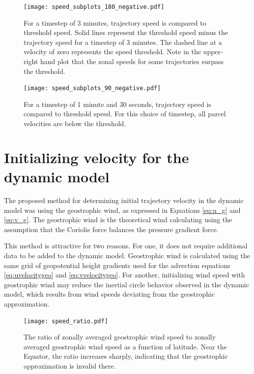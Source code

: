 \begin{figure}
    \texttt{[image: speed\_subplots\_180\_negative.pdf]}
    \centering
    \caption{For a timestep of 3 minutes, trajectory speed is compared to threshold speed.
    Solid lines represent the threshold speed minus the trajectory speed for a timestep of 3 minutes. 
    The dashed line at a velocity of zero represents the speed threshold.
    Note in the upper-right hand plot that the zonal speeds for some trajectories surpass the threshold. }
    \label{fig:speed_subplots_180_negative}
\end{figure}

\begin{figure}
    \texttt{[image: speed\_subplots\_90\_negative.pdf]}
    \centering
    \caption{For a timestep of 1 minute and 30 seconds, trajectory speed is compared to threshold speed.
    For this choice of timestep, all parcel velocities are below the threshold.}
    \label{fig:speed_subplots_90_negative}
\end{figure}

\section{Initializing velocity for the dynamic model}

The proposed method for determining initial trajectory velocity in the dynamic model was using the geostrophic wind, as expressed in Equations \ref{eq:u_g} and \ref{eq:v_g}.
The geostrophic wind is the theoretical wind calculating using the assumption that the Coriolis force balances the pressure gradient force.

This method is attractive for two reasons.
For one, it does not require additional data to be added to the dynamic model.
Geostrophic wind is calculated using the same grid of geopotential height gradients used for the advection equations \ref{eq:uvelocitygeo} and \ref{eq:vvelocitygeo}.
For another, initializing wind speed with geostrophic wind may reduce the inertial circle behavior observed in the dynamic model, which results from wind speeds deviating from the geostrophic approximation.

\begin{figure}
    \centering
    \texttt{[image: speed\_ratio.pdf]}
    \caption{The ratio of zonally averaged geostrophic wind speed to zonally averaged geostrophic wind speed as a function of latitude.
    Near the Equator, the ratio increases sharply, indicating that the geostrophic approximation is invalid there.}
    \label{fig:speed_ratio}
\end{figure}

